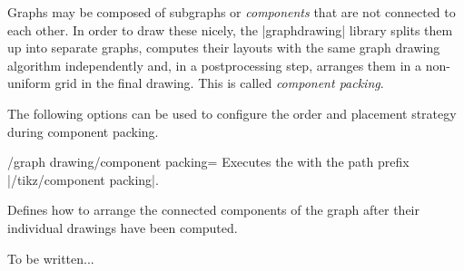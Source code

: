 Graphs may be composed of subgraphs or \emph{components} that are not
connected to each other. In order to draw these nicely, the 
|graphdrawing| library splits them up into separate graphs, computes
their layouts with the same graph drawing algorithm independently and,
in a postprocessing step, arranges them in a non-uniform grid in the 
final drawing. This is called \emph{component packing}.

The following options can be used to configure the order and placement
strategy during component packing.

\begin{key}{/graph drawing/component packing=}
  Executes the  with the path prefix 
  |/tikz/component packing|.
  
  Defines how to arrange the connected components of the graph after 
  their individual drawings have been computed.
\end{key}

To be written...

%
%


